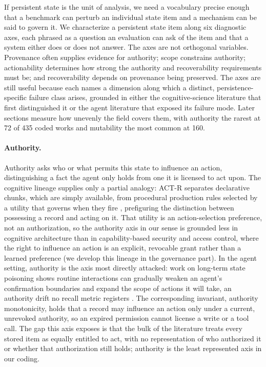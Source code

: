 If persistent state is the unit of analysis, we need a vocabulary precise enough that a benchmark can perturb an individual state item and a mechanism can be said to govern it. We characterize a persistent state item along six diagnostic axes, each phrased as a question an evaluation can ask of the item and that a system either does or does not answer. The axes are not orthogonal variables. Provenance often supplies evidence for authority; scope constrains authority; actionability determines how strong the authority and recoverability requirements must be; and recoverability depends on provenance being preserved. The axes are still useful because each names a dimension along which a distinct, persistence-specific failure class arises, grounded in either the cognitive-science literature that first distinguished it or the agent literature that exposed its failure mode. Later sections measure how unevenly the field covers them, with authority the rarest at 72 of 435 coded works and mutability the most common at 160.

\paragraph{Authority.} Authority asks who or what permits this state to influence an action, distinguishing a fact the agent only holds from one it is licensed to act upon. The cognitive lineage supplies only a partial analogy: ACT-R separates declarative chunks, which are simply available, from procedural production rules selected by a utility that governs when they fire \citep{anderson2004actr}, prefiguring the distinction between possessing a record and acting on it. That utility is an action-selection preference, not an authorization, so the authority axis in our sense is grounded less in cognitive architecture than in capability-based security and access control, where the right to influence an action is an explicit, revocable grant rather than a learned preference (we develop this lineage in the governance part). In the agent setting, authority is the axis most directly attacked: work on long-term state poisoning shows routine interactions can gradually weaken an agent's confirmation boundaries and expand the scope of actions it will take, an authority drift no recall metric registers \citep{xu2026toxicchats}. The corresponding invariant, authority monotonicity, holds that a record may influence an action only under a current, unrevoked authority, so an expired permission cannot license a write or a tool call. The gap this axis exposes is that the bulk of the literature treats every stored item as equally entitled to act, with no representation of who authorized it or whether that authorization still holds; authority is the least represented axis in our coding.

